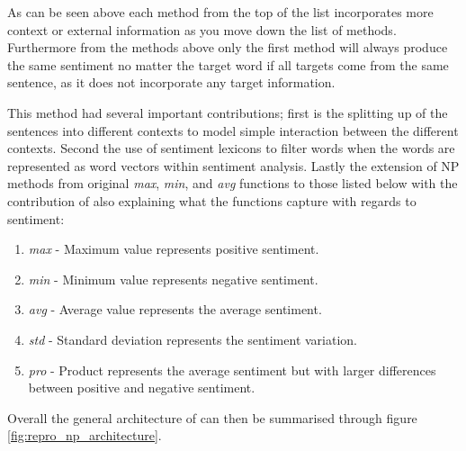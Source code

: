 As can be seen above each method from the top of the list incorporates more context or external information as you move down the list of methods. Furthermore from the methods above only the first method will always produce the same sentiment no matter the target word if all targets come from the same sentence, as it does not incorporate any target information.

This method had several important contributions; first is the splitting up of the sentences into different contexts to model simple interaction between the different contexts. Second the use of sentiment lexicons to filter words when the words are represented as word vectors within sentiment analysis. Lastly the extension of NP methods from \citet{tang-etal-2014-learning} original \textit{max}, \textit{min}, and \textit{avg} functions to those listed below with the contribution of also explaining what the functions capture with regards to sentiment:
\begin{enumerate}
    \item \textit{max} - Maximum value represents positive sentiment.
    \item \textit{min} - Minimum value represents negative sentiment.
    \item \textit{avg} - Average value represents the average sentiment.
    \item \textit{std} - Standard deviation represents the sentiment variation.
    \item \textit{pro} - Product represents the average sentiment but with larger differences between positive and negative sentiment.
\end{enumerate}
Overall the general architecture of \citet{vo2015target} can then be summarised through figure \ref{fig:repro_np_architecture}. 


